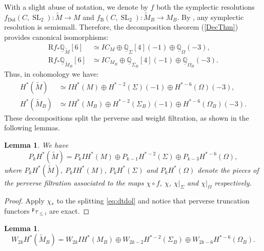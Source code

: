 \documentclass[JEP,XML,SOM,Unicode, NoEqCountersInSection,NoFloatCountersInSection,published]{cedram}
\newcommand{\IC}{\mathit{IC}}
\newcommand{\IH}{\mathit{IH}}
\newtheorem{lem}[thm]{Lemma}
\theoremstyle{definition}
\newcommand{\QQ}{\mathbb{Q}}
\newcommand{\Sl}{\operatorname{SL}}
\newcommand{\tm}{\widetilde{M}}
\begin{document}
With a slight abuse of notation, we denote by $f$ both the symplectic resolutions $f_{\mathrm{Dol}}(C,\Sl_2) \colon \widetilde{M} \to M$ and $f_{\mathrm{B}}(C,\Sl_2) \colon \widetilde{M}_B \to M_B$. By \cite[Lem.\,2.11]{Kaledin06}, any symplectic resolution is semismall. Therefore, the decomposition theorem (\cref{DecThm}) provides canonical isomorphisms:
\begin{align}\label{eq:dtdol}
\mathrm{R}f_*\underline{\QQ}_{\tm}[6]&\simeq \IC_{M}\oplus\underline{\QQ}_{\Sigma}[4](-1)\oplus \underline{\QQ}_{\Omega}(-3),
\\
\label{eq:dtb}
\mathrm{R}f_*\underline{\QQ}_{\widetilde{M}_B}[6]&\simeq \IC_{M_B}\oplus\underline{\QQ}_{\Sigma_B}[4](-1)\oplus \underline{\QQ}_{\Omega_B}(-3).
\end{align}
Thus, in cohomology
we have:
\begin{align}
H^*(\widetilde{M})&\simeq \IH^*(M)\oplus H^{*-2}(\Sigma)(-1)\oplus H^{*-6}(\Omega)(-3),\\ \label{eq:decompositioncohMtilde}
H^*(\widetilde{M}_B)&\simeq \IH^*(M_B)\oplus H^{*-2}(\Sigma_B)(-1)\oplus H^{*-6}(\Omega_B)(-3).
\end{align}
These decompositions split the perverse and weight filtration, as shown in the following lemmas.

\begin{lem}\label{lem:splittingp}
We have
\[
P_k H^*(\widetilde{M})=P_k \IH^*(M)\oplus P_{k-1}H^{*-2}(\Sigma)\oplus P_{k-3}H^{*-6}(\Omega),
\]
where $P_k H^*(\widetilde{M})$, $P_k \IH^*(M)$, $P_{k}H^{*}(\Sigma)$ and $ P_{k}H^{*}(\Omega)$ denote the pieces of the perverse filtration associated to the maps $\chi \circ f$, $\chi$, $\chi|_{\Sigma}$ and $\chi|_{\Omega}$ respectively.
\end{lem}
\begin{proof}
Apply $\chi_*$ to the splitting \eqref{eq:dtdol} and notice that perverse truncation functors $^{\mathfrak{p}}\tau_{\leq i}$ are exact.
\end{proof}

\skpt
\begin{lem}\label{lem:splittingw}
\mbox{}\vspace*{-1.1\baselineskip}
\[
W_{2k} H^*(\widetilde{M}_B)=W_{2k}\IH^*(M_B)\oplus W_{2k-2}H^{*-2}(\Sigma_B)\oplus W_{2k-6}H^{*-6}(\Omega_B).
\]
\end{lem}
\end{document}
